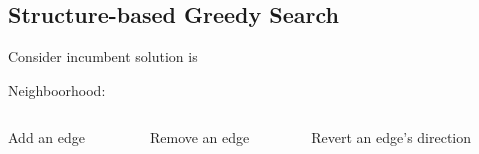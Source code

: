 \subsection{Structure-based Greedy Search}

\begin{frame}[fragile]
	Consider incumbent solution is
	\begin{figure}
		\centering
		
	\end{figure}
	Neighboorhood:
	\begin{columns}
		\begin{column}{.3\textwidth}
			\begin{figure}
				\centering
				
			\end{figure}
			\centering
			Add an edge
		\end{column}
		\begin{column}{.3\textwidth}
			\begin{figure}
				\centering
				
			\end{figure}
			\centering
			Remove an edge
		\end{column}
		\begin{column}{.3\textwidth}
			\begin{figure}
				\centering
				
			\end{figure}
			\centering
			Revert an edge's direction
		\end{column}
	\end{columns}
\end{frame}